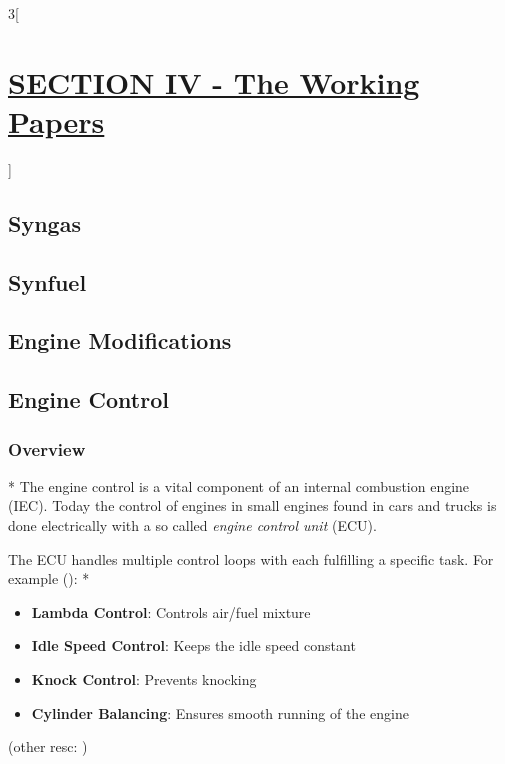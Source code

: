 \documentclass[11pt,a4paper,numbers=noenddot]{scrartcl}
\newcommand{\sideref}[1]{\switchcolumn[2]* {\raggedright
		\vspace*{-1.5\baselineskip}
		{\footnotesize \fullcite{#1}}
	}
	\switchcolumn[1]}
\begin{document}
\newpage
\begin{paracol}{3}[\section{\underline{SECTION IV - The Working Papers}}]
	\switchcolumn[0]
	\subsection{Syngas}\label{subsec:WP_syngas}
	\switchcolumn[1]
	\switchcolumn[0]
	\subsection{Synfuel}\label{subsec:WP_synfuel}
	\switchcolumn[1]
	\switchcolumn[0]
	\subsection{Engine Modifications}\label{subsec:WP_enginemod}
	\switchcolumn[1]
	\switchcolumn[0]
	\subsection{Engine Control}\label{subsec:WP_engineControl}
	\subsubsection{Overview}
	\switchcolumn[1]*
	\vspace*{-1.5\baselineskip}
	The engine control is a vital component of an internal combustion engine (IEC). Today the control of engines in small engines found in cars and trucks is done electrically with a so called \textit{engine control unit} (ECU).
	
	The ECU handles multiple control loops with each fulfilling a specific task. For example (\autocite{kiencke2005}):
	\sideref{kiencke2005}
	\begin{itemize}
		\item \textbf{Lambda Control}: Controls air/fuel mixture
		\item \textbf{Idle Speed Control}: Keeps the idle speed constant
		\item \textbf{Knock Control}: Prevents knocking
		\item \textbf{Cylinder Balancing}: Ensures smooth running of the engine
	\end{itemize}
	
	(other resc: \autocite{Subramanian2018})
	
	 
\end{paracol}
\end{document}
